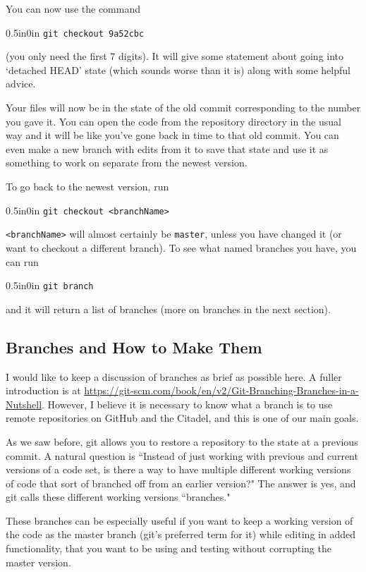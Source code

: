 \documentclass[11pt]{article}
\newcommand{\code}[1]{\begin{adjustwidth}{0.5in}{0in}
    \texttt{#1}
    \end{adjustwidth}}
\begin{document}
You can now use the command

\code{git checkout 9a52cbc}

(you only need the first 7 digits).  It will give some statement about going into `detached HEAD' state (which sounds worse than it is) along with some helpful advice.

Your files will now be in the state of the old commit corresponding to the number you gave it.  You can open the code from the repository directory in the usual way and it will be like you've gone back in time to that old commit.  You can even make a new branch with edits from it to save that state and use it as something to work on separate from the newest version.

To go back to the newest version, run

\code{git checkout <branchName>}

\texttt{<branchName>} will almost certainly be \texttt{master}, unless you have changed it (or want to checkout a different branch).  To see what named branches you have, you can run 

\code{git branch}

and it will return a list of branches (more on branches in the next section).
 
\subsection{Branches and How to Make Them}

I would like to keep a discussion of branches as brief as possible here.  A fuller introduction is at \url{https://git-scm.com/book/en/v2/Git-Branching-Branches-in-a-Nutshell}.  However, I believe it is necessary to know what a branch is to use remote repositories on GitHub and the Citadel, and this is one of our main goals.

As we saw before, git allows you to restore a repository to the state at a previous commit.  A natural question is ``Instead of just working with previous and current versions of a code set, is there a way to have multiple different working versions of code that sort of branched off from an earlier version?"  The answer is yes, and git calls these different working versions ``branches."

These branches can be especially useful if you want to keep a working version of the code as the master branch (git's preferred term for it) while editing in added functionality, that you want to be using and testing without corrupting the master version.
\end{document}
